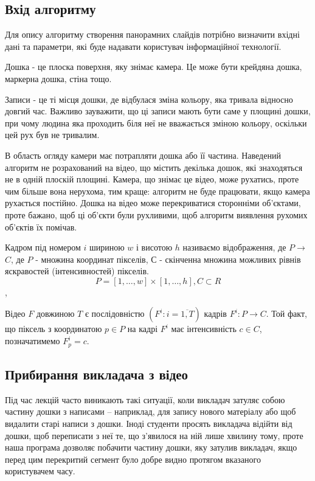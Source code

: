 \subsection{Вхід алгоритму}

Для опису алгоритму створення панорамних слайдів потрібно визначити 
вхідні дані та параметри, які буде надавати користувач інформаційної
технології.

Дошка - це плоска поверхня, яку знімає камера. Це може бути крейдяна 
дошка, маркерна дошка, стіна тощо.

Записи - це ті місця дошки, де відбулася зміна кольору, яка тривала 
відносно довгий час. Важливо зауважити, що ці записи мають бути 
саме у площині дошки, при чому людина яка проходить біля неї не вважається
зміною кольору, оскільки цей рух був не тривалим.

В область огляду камери має потрапляти дошка або її частина. Наведений 
алгоритм не розрахований на відео, що містить декілька дошок, які знаходяться
не в одній плоскій площині. Камера, що знімає це відео, може рухатись, проте 
чим більше вона нерухома, тим краще: алгоритм не буде працювати, якщо камера 
рухається постійно. Дошка на відео може перекриватися сторонніми об'єктами, 
проте бажано, щоб ці об'єкти були рухливими, щоб алгоритм виявлення рухомих 
об'єктів їх помічав.

Кадром під номером $i$ шириною $w$ і висотою $h$ називаємо відображення, де 
$P$$\to$$C$, де $P$ - множина координат пікселів, $С$ - скінченна множина можливих рівнів
яскравостей (інтенсивностей) пікселів.
\begin{equation}
    P = [1, \ldots ,w]\times[1, \ldots, h], C \subset R
\end{equation},

Відео \(F\) довжиною \(T\)
є послідовністю \(\left( F^{i}:i = \overline{1,T} \right)\) кадрів
\(F^{i}:P \rightarrow C\). Той факт, що піксель з координатою
\(p \in P\) на кадрі \(F^{i}\) має інтенсивність \(c \in C\),
позначатимемо \(F_{p}^{i} = c\).


\subsection{Прибирання викладача з відео}

Під час лекцій часто виникають такі ситуації, коли викладач затуляє
собою частину дошки з написами -- наприклад, для запису нового матеріалу
або щоб видалити старі написи з дошки. Іноді студенти просять викладача
відійти від дошки, щоб переписати з неї те, що з'явилося на ній лише
хвилину тому, проте наша програма дозволяє побачити частину дошки, яку
затулив викладач, якщо перед цим перекритий сегмент було добре видно
протягом вказаного користувачем часу.

